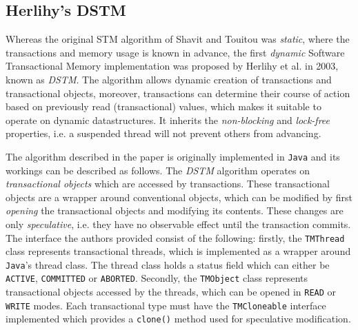 \subsection{Herlihy's DSTM}
Whereas the original STM algorithm of Shavit and Touitou was \textit{static}, where the transactions and memory usage is known in advance\cite{shavit-stm}, the first \textit{dynamic} Software Transactional Memory implementation was proposed by Herlihy et al. in 2003, known as \textit{DSTM}\cite{DSTM}. The algorithm allows dynamic creation of transactions and transactional objects, moreover, transactions can determine their course of action based on previously read (transactional) values, which makes it suitable to operate on dynamic datastructures\cite{DSTM}. It inherits the \textit{non-blocking} and \textit{lock-free} properties, i.e. a suspended thread will not prevent others from advancing. 

The algorithm described in the paper is originally implemented in \texttt{Java} and its workings can be described as follows. The \textit{DSTM} algorithm operates on \textit{transactional objects} which are accessed by transactions. These transactional objects are a wrapper around conventional objects, which can be modified by first \textit{opening} the transactional objects and modifying its contents\cite{DSTM}. These changes are only \textit{speculative}, i.e. they have no observable effect until the transaction commits. The interface the authors provided consist of the following: firstly, the \texttt{TMThread} class represents transactional threads, which is implemented as a wrapper around \texttt{Java}'s thread class. The thread class holds a status field which can either be \texttt{ACTIVE}, \texttt{COMMITTED} or \texttt{ABORTED}. Secondly, the \texttt{TMObject} class represents transactional objects accessed by the threads, which can be opened in \texttt{READ} or \texttt{WRITE} modes. Each transactional type must have the \texttt{TMCloneable} interface implemented which provides a \texttt{clone()} method used for speculative modification\cite{DSTM}. 

